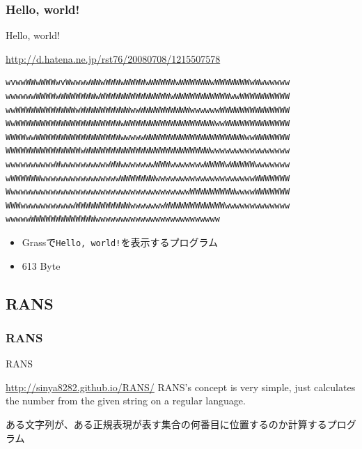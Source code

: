 \documentclass[12pt, unicode, svgnames, handout]{beamer}
\begin{document}
\begin{frame}[fragile]
  \frametitle{Hello, world!}

  \begin{exampleblock}{Hello, world!}
    \begin{shadequote}[r]{\scriptsize\url{http://d.hatena.ne.jp/rst76/20080708/1215507578}}
\begin{lstlisting}[style=grass]
wvwwWWwWWWwvWwwwwWWwWWWwWWWWwWWWWWwWWWWWWwWWWWWWWwWwwwwww
wwwwwwWWWWwWWWWWWWwWWWWWWWWWWWWWWwWWWWWWWWWWWwwWWWWWWWWWW
wwWWWWWWWWWWWWwWWWWWWWWWWwwWWWWWWWWWWwwwwwwWWWWWWWWWWWWWW
WwWWWWWWWWWWWWWWWWWWWWWwWWWWWWWWWWWWWWWWWWwwWWWWWWWWWWWWW
WWWWwwWWWWWWWWWWWWWWWWWwwwwwWWWWWWWWWWWWWWWWWWWWwwWWWWWWW
WWWWWWWWWWWWWWWwWWWWWWWWWWWWWWWWWWWWWWWWWwwwwwwwwwwwwwwww
wwwwwwwwwwWwwwwwwwwwwWWwwwwwwwWWWwwwwwwwWWWWwWWWWWwwwwwww
wWWWWWWwwwwwwwwwwwwwwwwWWWWWWWwwwwwwwwwwwwwwwwwwwwWWWWWWW
WwwwwwwwwwwwwwwwwwwwwwwwwwwwwwwwwwwwwWWWWWWWWWwwwwWWWWWWW
WWWwwwwwwwwwwwWWWWWWWWWWWwwwwwwwWWWWWWWWWWWWwwwwwwwwwwwww
wwwwwWWWWWWWWWWWWWwwwwwwwwwwwwwwwwwwwwwwwww
\end{lstlisting}
    \end{shadequote}
  \end{exampleblock}

  \begin{itemize}
    \item<2-> Grassで\texttt{Hello, world!}を表示するプログラム
    \item<3-> 613 Byte
  \end{itemize}
\end{frame}

\subsection{RANS}
\begin{frame}[fragile]
  \frametitle{RANS}

  \begin{block}{RANS}
    \begin{shadequote}[r]{\scriptsize\url{http://sinya8282.github.io/RANS/}}
      RANS's concept is very simple, just calculates the number from the given string on a regular language.
    \end{shadequote}
  \end{block}

   {
    ある文字列が、ある正規表現が表す集合の何番目に位置するのか計算するプログラム
  }
\end{frame}
\end{document}
